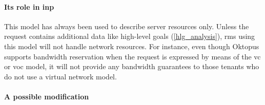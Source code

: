
\paragraph{Its role in \texorpdfstring{\gls{inp}}{INP}}
This model has always been used to describe server resources only.
Unless the request contains additional data like high-level goals (\autoref{hlg_analysis}), \glspl{rm} using this model will not handle network resources.
For instance, even though Oktopus \cite{oktopus} supports bandwidth reservation when the request is expressed by means of the \gls{vc} or \gls{voc} model, it will not provide any bandwidth guarantees to those tenants who do not use a virtual network model.

\paragraph{A possible modification}
